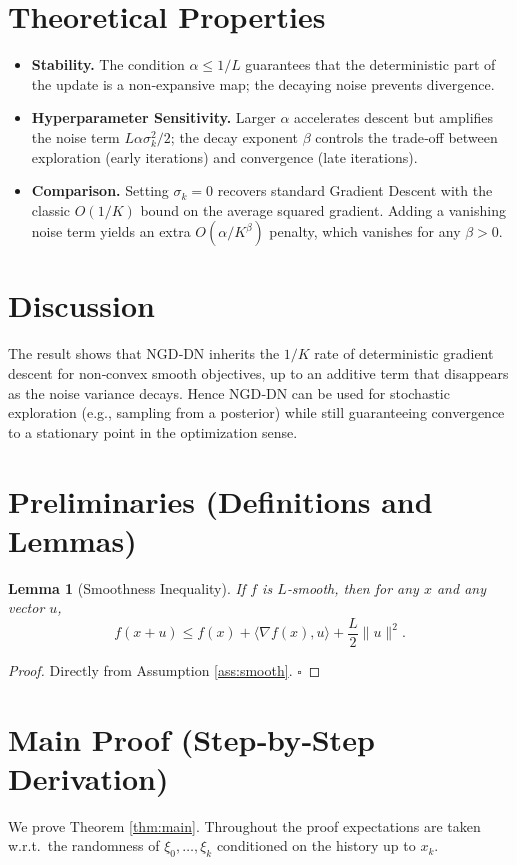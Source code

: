 \documentclass[11pt]{article}
\newtheorem{lemma}{Lemma}
\begin{document}
\section*{Theoretical Properties}
\begin{itemize}
\item \textbf{Stability.} The condition $\alpha\le 1/L$ guarantees that the deterministic part of the update is a non‑expansive map; the decaying noise prevents divergence.
\item \textbf{Hyperparameter Sensitivity.} Larger $\alpha$ accelerates descent but amplifies the noise term $L\alpha\sigma_{k}^{2}/2$; the decay exponent $\beta$ controls the trade‑off between exploration (early iterations) and convergence (late iterations).
\item \textbf{Comparison.} Setting $\sigma_{k}=0$ recovers standard Gradient Descent with the classic $O(1/K)$ bound on the average squared gradient. Adding a vanishing noise term yields an extra $O(\alpha/K^{\beta})$ penalty, which vanishes for any $\beta>0$.
\end{itemize}

\section*{Discussion}
The result shows that NGD‑DN inherits the $1/K$ rate of deterministic gradient descent for non‑convex smooth objectives, up to an additive term that disappears as the noise variance decays. Hence NGD‑DN can be used for stochastic exploration (e.g., sampling from a posterior) while still guaranteeing convergence to a stationary point in the optimization sense.

\newpage

\section*{Preliminaries (Definitions and Lemmas)}
\begin{lemma}[Smoothness Inequality]\label{lem:smooth}
If $f$ is $L$‑smooth, then for any $x$ and any vector $u$,
\[
f(x+u)\le f(x)+\langle\nabla f(x),u\rangle+\frac{L}{2}\|u\|^{2}.
\]
\end{lemma}
\begin{proof}
Directly from Assumption \ref{ass:smooth}. \hfill $\square$
\end{proof}

\section*{Main Proof (Step‑by‑Step Derivation)}
We prove Theorem \ref{thm:main}. Throughout the proof expectations are taken w.r.t.\ the randomness of $\xi_{0},\dots,\xi_{k}$ conditioned on the history up to $x_{k}$.
\end{document}
